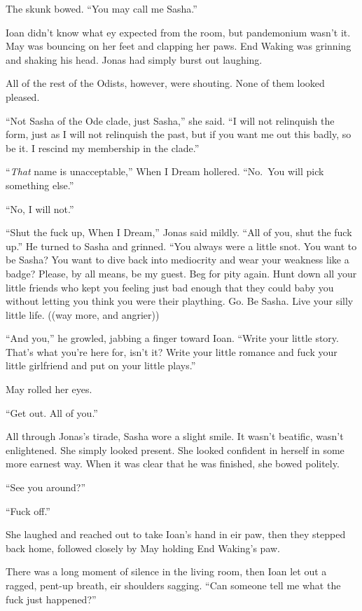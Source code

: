 The skunk bowed. ``You may call me Sasha.''

Ioan didn't know what ey expected from the room, but pandemonium wasn't it. May was bouncing on her feet and clapping her paws. End Waking was grinning and shaking his head. Jonas had simply burst out laughing.

All of the rest of the Odists, however, were shouting. None of them looked pleased.

``Not Sasha of the Ode clade, just Sasha,'' she said. ``I will not relinquish the form, just as I will not relinquish the past, but if you want me out this badly, so be it. I rescind my membership in the clade.''

``\emph{That} name is unacceptable,'' When I Dream hollered. ``No.~You will pick something else.''

``No, I will not.''

``Shut the fuck up, When I Dream,'' Jonas said mildly. ``All of you, shut the fuck up.'' He turned to Sasha and grinned. ``You always were a little snot. You want to be Sasha? You want to dive back into mediocrity and wear your weakness like a badge? Please, by all means, be my guest. Beg for pity again. Hunt down all your little friends who kept you feeling just bad enough that they could baby you without letting you think you were their plaything. Go. Be Sasha. Live your silly little life. ((way more, and angrier))

``And you,'' he growled, jabbing a finger toward Ioan. ``Write your little story. That's what you're here for, isn't it? Write your little romance and fuck your little girlfriend and put on your little plays.''

May rolled her eyes.

``Get out. All of you.''

All through Jonas's tirade, Sasha wore a slight smile. It wasn't beatific, wasn't enlightened. She simply looked present. She looked confident in herself in some more earnest way. When it was clear that he was finished, she bowed politely.

``See you around?''

``Fuck off.''

She laughed and reached out to take Ioan's hand in eir paw, then they stepped back home, followed closely by May holding End Waking's paw.

There was a long moment of silence in the living room, then Ioan let out a ragged, pent-up breath, eir shoulders sagging. ``Can someone tell me what the fuck just happened?''

